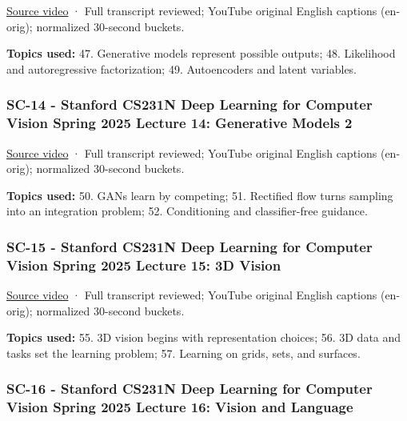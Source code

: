 \href{https://www.youtube.com/watch?v=zbHXQRUNlH0}{Source video} · Full transcript reviewed; YouTube original English captions (en-orig); normalized 30-second buckets.

\textbf{Topics used:} 47. Generative models represent possible outputs; 48. Likelihood and autoregressive factorization; 49. Autoencoders and latent variables.

\subsubsection{SC-14 - Stanford CS231N Deep Learning for Computer Vision Spring 2025 Lecture 14: Generative Models 2}\label{04-visual-computing-ii-ch036-sc-14---stanford-cs231n-deep-learning-for-computer-vision-spring-2025-lecture-14-generative-models-2}

\hypertarget{04-visual-computing-ii-ch036-sc-14---stanford-cs231n-deep-learning-for-computer-vision-spring-2025-lecture-14-generative-models-2}{}

\href{https://www.youtube.com/watch?v=Edr4uZFh4EE}{Source video} · Full transcript reviewed; YouTube original English captions (en-orig); normalized 30-second buckets.

\textbf{Topics used:} 50. GANs learn by competing; 51. Rectified flow turns sampling into an integration problem; 52. Conditioning and classifier-free guidance.

\subsubsection{SC-15 - Stanford CS231N Deep Learning for Computer Vision Spring 2025 Lecture 15: 3D Vision}\label{04-visual-computing-ii-ch036-sc-15---stanford-cs231n-deep-learning-for-computer-vision-spring-2025-lecture-15-3d-vision}

\hypertarget{04-visual-computing-ii-ch036-sc-15---stanford-cs231n-deep-learning-for-computer-vision-spring-2025-lecture-15-3d-vision}{}

\href{https://www.youtube.com/watch?v=7lxrKDKtykM}{Source video} · Full transcript reviewed; YouTube original English captions (en-orig); normalized 30-second buckets.

\textbf{Topics used:} 55. 3D vision begins with representation choices; 56. 3D data and tasks set the learning problem; 57. Learning on grids, sets, and surfaces.

\subsubsection{SC-16 - Stanford CS231N Deep Learning for Computer Vision Spring 2025 Lecture 16: Vision and Language}\label{04-visual-computing-ii-ch036-sc-16---stanford-cs231n-deep-learning-for-computer-vision-spring-2025-lecture-16-vision-and-language}

